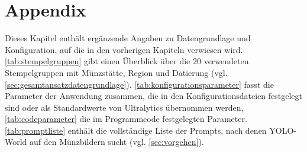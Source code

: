 

\chapter{Appendix}\label{app:example}
\glsresetall %

Dieses Kapitel enthält ergänzende Angaben zu Datengrundlage und Konfiguration, auf die in den vorherigen Kapiteln verwiesen wird. \cref{tab:stempelgruppen} gibt einen Überblick über die 20 verwendeten Stempelgruppen mit Münzstätte, Region und Datierung (vgl. \cref{sec:gesamtansatzdatengrundlage}). \cref{tab:konfigurationsparameter} fasst die Parameter der Anwendung zusammen, die in den Konfigurationsdateien festgelegt sind oder als Standardwerte von Ultralytics übernommen werden, \cref{tab:codeparameter} die im Programmcode festgelegten Parameter. \cref{tab:promptliste} enthält die vollständige Liste der Prompts, nach denen YOLO-World auf den Münzbildern sucht (vgl. \cref{sec:vorgehen}).

